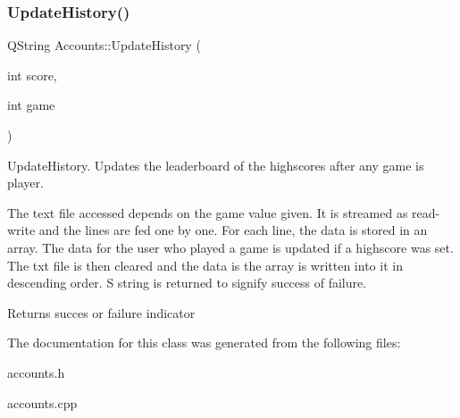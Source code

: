 \subsubsection{\texorpdfstring{Update\+History()}{UpdateHistory()}}
{\footnotesize\ttfamily Q\+String Accounts\+::\+Update\+History (\begin{DoxyParamCaption}\item[{int}]{score,  }\item[{int}]{game }\end{DoxyParamCaption})}



Update\+History. Updates the leaderboard of the highscores after any game is player. 

The text file accessed depends on the game value given. It is streamed as read-\/write and the lines are fed one by one. For each line, the data is stored in an array. The data for the user who played a game is updated if a highscore was set. The txt file is then cleared and the data is the array is written into it in descending order. S string is returned to signify success of failure. \begin{DoxyReturn}{Returns}
succes or failure indicator 
\end{DoxyReturn}


The documentation for this class was generated from the following files\+:\begin{DoxyCompactItemize}
\item 
accounts.\+h\item 
accounts.\+cpp\end{DoxyCompactItemize}

